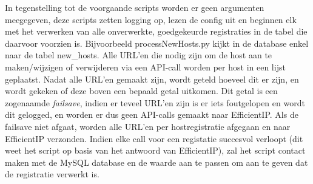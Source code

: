 In tegenstelling tot de voorgaande scripts worden er geen argumenten meegegeven, deze scripts zetten logging op, lezen de config uit en beginnen elk met het verwerken van alle onverwerkte, goedgekeurde registraties in de tabel die daarvoor voorzien is. Bijvoorbeeld processNewHosts.py kijkt in de database enkel naar de tabel new\_hosts.
Alle URL'en die nodig zijn om de host aan te maken/wijzigen of verwijderen via een API-call worden per host in een lijst geplaatst.
Nadat alle URL'en gemaakt zijn, wordt geteld hoeveel dit er zijn, en wordt gekeken of deze boven een bepaald getal uitkomen.
Dit getal is een zogenaamde \textit{failsave}, indien er teveel URL'en zijn is er iets foutgelopen en wordt dit gelogged, en worden er dus geen API-calls gemaakt naar EfficientIP.
Als de failsave niet afgaat, worden alle URL'en per hostregistratie afgegaan en naar EfficientIP verzonden. 
Indien elke call voor een registatie succesvol verloopt (dit weet het script op basis van het antwoord van EfficientIP), zal het script contact maken met de MySQL database en de waarde aan te passen om aan te geven dat de registratie verwerkt is.



